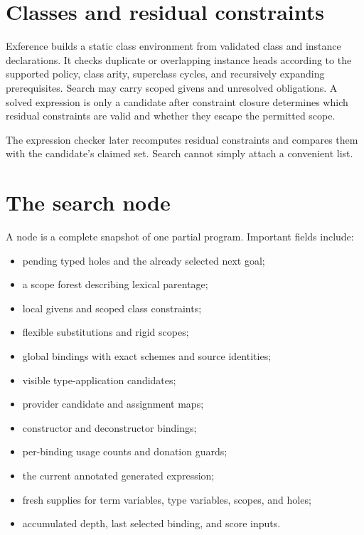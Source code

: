 \documentclass[10pt,letterpaper,oneside]{report}
\begin{document}
\section{Classes and residual constraints}

Exference builds a static class environment from validated class and instance declarations. It checks duplicate or overlapping instance heads according to the supported policy, class arity, superclass cycles, and recursively expanding prerequisites. Search may carry scoped givens and unresolved obligations. A solved expression is only a candidate after constraint closure determines which residual constraints are valid and whether they escape the permitted scope.

The expression checker later recomputes residual constraints and compares them with the candidate's claimed set. Search cannot simply attach a convenient list.

\section{The search node}\label{sec:exference-node}

A node is a complete snapshot of one partial program. Important fields include:

\begin{itemize}
  \item pending typed holes and the already selected next goal;
  \item a scope forest describing lexical parentage;
  \item local givens and scoped class constraints;
  \item flexible substitutions and rigid scopes;
  \item global bindings with exact schemes and source identities;
  \item visible type-application candidates;
  \item provider candidate and assignment maps;
  \item constructor and deconstructor bindings;
  \item per-binding usage counts and donation guards;
  \item the current annotated generated expression;
  \item fresh supplies for term variables, type variables, scopes, and holes;
  \item accumulated depth, last selected binding, and score inputs.
\end{itemize}
\end{document}
